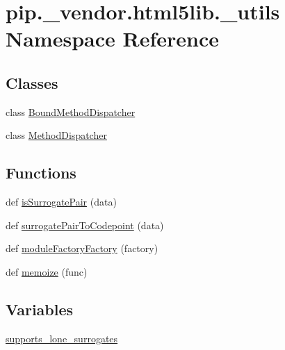\hypertarget{namespacepip_1_1__vendor_1_1html5lib_1_1__utils}{}\section{pip.\+\_\+vendor.\+html5lib.\+\_\+utils Namespace Reference}
\label{namespacepip_1_1__vendor_1_1html5lib_1_1__utils}
\subsection*{Classes}
\begin{DoxyCompactItemize}
\item 
class \hyperlink{classpip_1_1__vendor_1_1html5lib_1_1__utils_1_1BoundMethodDispatcher}{Bound\+Method\+Dispatcher}
\item 
class \hyperlink{classpip_1_1__vendor_1_1html5lib_1_1__utils_1_1MethodDispatcher}{Method\+Dispatcher}
\end{DoxyCompactItemize}
\subsection*{Functions}
\begin{DoxyCompactItemize}
\item 
def \hyperlink{namespacepip_1_1__vendor_1_1html5lib_1_1__utils_a235e12ed46bfaf7f2b990b547e32d1f9}{is\+Surrogate\+Pair} (data)
\item 
def \hyperlink{namespacepip_1_1__vendor_1_1html5lib_1_1__utils_a029fa60ae23aa86dcedde54d5d7f147d}{surrogate\+Pair\+To\+Codepoint} (data)
\item 
def \hyperlink{namespacepip_1_1__vendor_1_1html5lib_1_1__utils_abe40c89ff4a078f2e0c1ffbcc03b8e74}{module\+Factory\+Factory} (factory)
\item 
def \hyperlink{namespacepip_1_1__vendor_1_1html5lib_1_1__utils_a7f2a9934cd0a22f16c9a549d1a979cf1}{memoize} (func)
\end{DoxyCompactItemize}
\subsection*{Variables}
\begin{DoxyCompactItemize}
\item 
\hyperlink{namespacepip_1_1__vendor_1_1html5lib_1_1__utils_ae0e50b71a6761bbc4c9f7c7bd617e161}{supports\+\_\+lone\+\_\+surrogates}
\end{DoxyCompactItemize}


